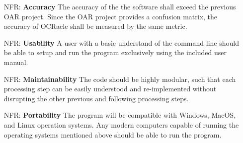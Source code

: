 \documentclass[12pt]{article}
\newcounter{nfrnum} %
\begin{document}
\noindent \begin{itemize}

\item[NFR\refstepcounter{nfrnum}\thenfrnum \label{NFR_Accuracy}:]
  \textbf{Accuracy} The accuracy of the the software shall exceed the previous
  OAR project. Since the OAR project provides a confusion matrix, the accuracy
  of OCRacle shall be measured by the same metric. \cite{Ceranic2024}
  

\item[NFR\refstepcounter{nfrnum}\thenfrnum \label{NFR_Usability}:] \textbf{Usability}
  A user with a basic understand of the command line should be able to setup and
  run the program exclusively using the included user manual.


\item[NFR\refstepcounter{nfrnum}\thenfrnum \label{NFR_Maintainability}:]
  \textbf{Maintainability} 
  The code should be highly modular, such that each processing step can be easily
  understood and re-implemented without disrupting the other previous and
  following processing steps.


\item[NFR\refstepcounter{nfrnum}\thenfrnum \label{NFR_Portability}:]
  \textbf{Portability} The program will be compatible with Windows, MacOS, and
  Linux operation systems. Any modern computers capable of running the operating
  systems mentioned above should be able to run the program.


\end{itemize}
\end{document}
